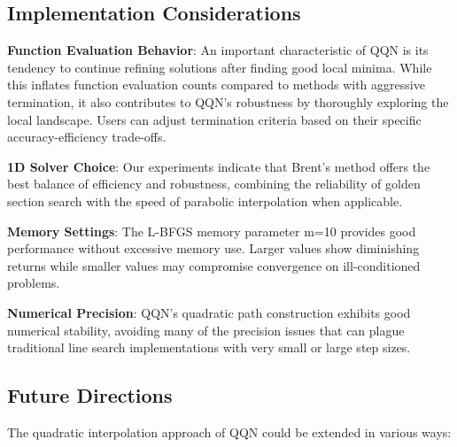 \hypertarget{implementation-considerations}{%
\subsection{Implementation Considerations}\label{implementation-considerations}}

\textbf{Function Evaluation Behavior}: An important characteristic of QQN is its tendency to continue refining solutions after finding good local minima.
While this inflates function evaluation counts compared to methods with aggressive termination, it also contributes to QQN's robustness by thoroughly exploring the local landscape.
Users can adjust termination criteria based on their specific accuracy-efficiency trade-offs.

\textbf{1D Solver Choice}: Our experiments indicate that Brent's method offers the best balance of efficiency and robustness, combining the reliability of golden section search with the speed of parabolic interpolation when applicable.

\textbf{Memory Settings}: The L-BFGS memory parameter m=10 provides good performance without excessive memory use.
Larger values show diminishing returns while smaller values may compromise convergence on ill-conditioned problems.

\textbf{Numerical Precision}: QQN's quadratic path construction exhibits good numerical stability, avoiding many of the precision issues that can plague traditional line search implementations with very small or large step sizes.

\hypertarget{future-directions}{%
\subsection{Future Directions}\label{future-directions}}

The quadratic interpolation approach of QQN could be extended in various ways:

